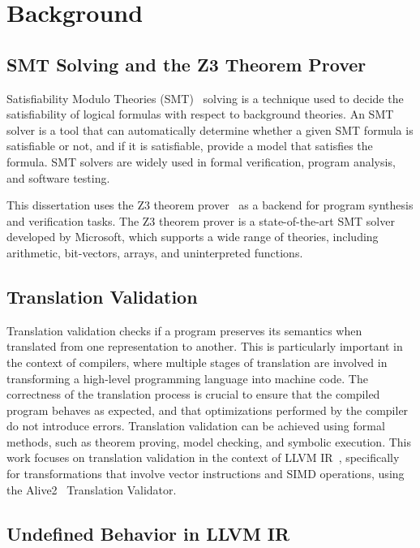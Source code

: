 \chapter{Background}
\label{chap:background}

\section {SMT Solving and the Z3 Theorem Prover}

Satisfiability Modulo Theories (SMT)~\cite{barrett2018satisfiability}
solving is a technique used to decide the satisfiability of logical
formulas with respect to background theories.
%
An SMT solver is a tool that can automatically determine whether a
given SMT formula is satisfiable or not, and if it is satisfiable,
provide a model that satisfies the formula.
%
SMT solvers are widely used in formal verification, program analysis,
and software testing.

This dissertation uses the Z3 theorem prover~\cite{z3} as a backend
for program synthesis and verification tasks.
%
The Z3 theorem prover is a state-of-the-art SMT solver developed by
Microsoft, which supports a wide range of theories, including
arithmetic, bit-vectors, arrays, and uninterpreted functions.

\section {Translation Validation}

Translation validation checks if a program preserves its semantics
when translated from one representation to another.
%
This is particularly important in the context of compilers,
where multiple stages of translation are involved in transforming a
high-level programming language into machine code.
%
The correctness of the translation process is crucial to ensure that
the compiled program behaves as expected, and that optimizations
performed by the compiler do not introduce errors.
%
Translation validation can be achieved using formal methods, such as
theorem proving, model checking, and symbolic execution.
%
This work focuses on translation validation in the context of LLVM
IR~\cite{llvm}, specifically for transformations that involve
vector instructions and SIMD operations, using the
Alive2~\cite{alive2} Translation Validator.

\section {Undefined Behavior in LLVM IR}


